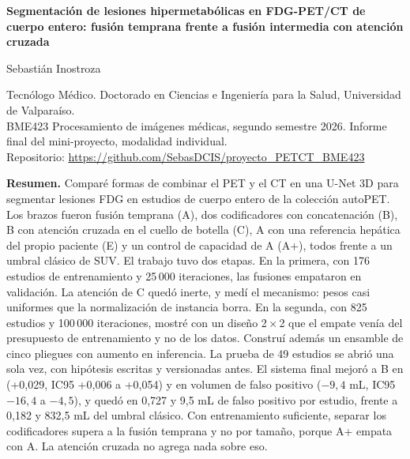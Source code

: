 {\raggedright\sffamily\bfseries\LARGE Segmentación de lesiones hipermetabólicas en FDG-PET/CT de cuerpo entero: fusión temprana frente a fusión intermedia con atención cruzada\par}
\vspace{0.8em}
{\large Sebastián Inostroza\par}
{\small Tecnólogo Médico. Doctorado en Ciencias e Ingeniería para la Salud, Universidad de Valparaíso.\\
BME423 Procesamiento de imágenes médicas, segundo semestre 2026. Informe final del mini-proyecto, modalidad individual.\\
Repositorio: \url{https://github.com/SebasDCIS/proyecto_PETCT_BME423}\par}
\vspace{1.0em}

\begin{center}
\begin{minipage}{0.92\linewidth}
\small
\textbf{Resumen.} Comparé formas de combinar el PET y el CT en una U-Net 3D para segmentar lesiones FDG en estudios de cuerpo entero de la colección autoPET. Los brazos fueron fusión temprana (A), dos codificadores con concatenación (B), B con atención cruzada en el cuello de botella (C), A con una referencia hepática del propio paciente (E) y un control de capacidad de A (A+), todos frente a un umbral clásico de SUV. El trabajo tuvo dos etapas. En la primera, con 176 estudios de entrenamiento y 25\,000 iteraciones, las fusiones empataron en validación. La atención de C quedó inerte, y medí el mecanismo: pesos casi uniformes que la normalización de instancia borra. En la segunda, con 825 estudios y 100\,000 iteraciones, mostré con un diseño 2\,×\,2 que el empate venía del presupuesto de entrenamiento y no de los datos. Construí además un ensamble de cinco pliegues con aumento en inferencia. La prueba de 49 estudios se abrió una sola vez, con hipótesis escritas y versionadas antes. El sistema final mejoró a B en \dmas{} (+0,029, IC95 +0,006 a +0,054) y en volumen de falso positivo ($-9{,}4$ mL, IC95 $-16{,}4$ a $-4{,}5$), y quedó en \dmas{} 0,727 y 9,5 mL de falso positivo por estudio, frente a 0,182 y 832,5 mL del umbral clásico. Con entrenamiento suficiente, separar los codificadores supera a la fusión temprana y no por tamaño, porque A+ empata con A. La atención cruzada no agrega nada sobre eso.
\end{minipage}
\end{center}
\vspace{0.4em}
